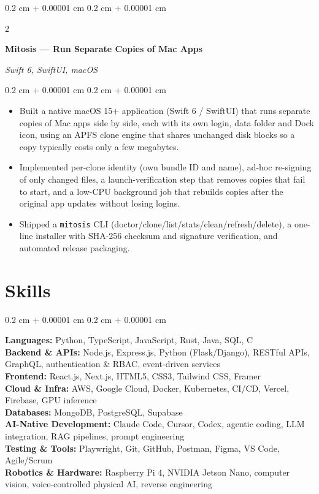 \documentclass[10pt, letterpaper]{article}
\newenvironment{highlights}{
    \begin{itemize}[
        topsep=0.10 cm,
        parsep=0.10 cm,
        partopsep=0pt,
        itemsep=0pt,
        leftmargin=0.4 cm + 10pt
    ]
}{
    \end{itemize}
} %
\newenvironment{onecolentry}{
    \begin{adjustwidth}{
        0.2 cm + 0.00001 cm
    }{
        0.2 cm + 0.00001 cm
    }
}{
    \end{adjustwidth}
} %
\newenvironment{twocolentry}[2][]{
    \onecolentry
    \def\secondColumn{#2}
    \setcolumnwidth{\fill, 5.0 cm}
    \begin{paracol}{2}
}{
    \switchcolumn \raggedleft \secondColumn
    \end{paracol}
    \endonecolentry
} %
\let\hrefWithoutArrow\href
\renewcommand{\href}[2]{\hrefWithoutArrow{#1}{\ifthenelse{\equal{#2}{}}{ }{#2 }\raisebox{.15ex}{\footnotesize \faExternalLink*}}}
\begin{document}
    \vspace{0.12 cm}
    \begin{twocolentry}{
        \textit{Swift 6, SwiftUI, macOS}
    }
        \textbf{Mitosis --- Run Separate Copies of Mac Apps} \href{https://github.com/deadhearth01/Mitosis}{\faGithub}
    \end{twocolentry}
    \vspace{0.10 cm}
    \begin{onecolentry}
        \begin{highlights}
            \item Built a native macOS 15+ application (Swift 6 / SwiftUI) that runs separate copies of Mac apps side by side, each with its own login, data folder and Dock icon, using an APFS clone engine that shares unchanged disk blocks so a copy typically costs only a few megabytes.
            \item Implemented per-clone identity (own bundle ID and name), ad-hoc re-signing of only changed files, a launch-verification step that removes copies that fail to start, and a low-CPU background job that rebuilds copies after the original app updates without losing logins.
            \item Shipped a \texttt{mitosis} CLI (doctor/clone/list/stats/clean/refresh/delete), a one-line installer with SHA-256 checksum and signature verification, and automated release packaging.
        \end{highlights}
    \end{onecolentry}

    \section{Skills}
    \begin{onecolentry}
        \textbf{Languages:} Python, TypeScript, JavaScript, Rust, Java, SQL, C \\
        \textbf{Backend \& APIs:} Node.js, Express.js, Python (Flask/Django), RESTful APIs, GraphQL, authentication \& RBAC, event-driven services \\
        \textbf{Frontend:} React.js, Next.js, HTML5, CSS3, Tailwind CSS, Framer \\
        \textbf{Cloud \& Infra:} AWS, Google Cloud, Docker, Kubernetes, CI/CD, Vercel, Firebase, GPU inference \\
        \textbf{Databases:} MongoDB, PostgreSQL, Supabase \\
        \textbf{AI-Native Development:} Claude Code, Cursor, Codex, agentic coding, LLM integration, RAG pipelines, prompt engineering \\
        \textbf{Testing \& Tools:} Playwright, Git, GitHub, Postman, Figma, VS Code, Agile/Scrum \\
        \textbf{Robotics \& Hardware:} Raspberry Pi 4, NVIDIA Jetson Nano, computer vision, voice-controlled physical AI, reverse engineering
    \end{onecolentry}
\end{document}
